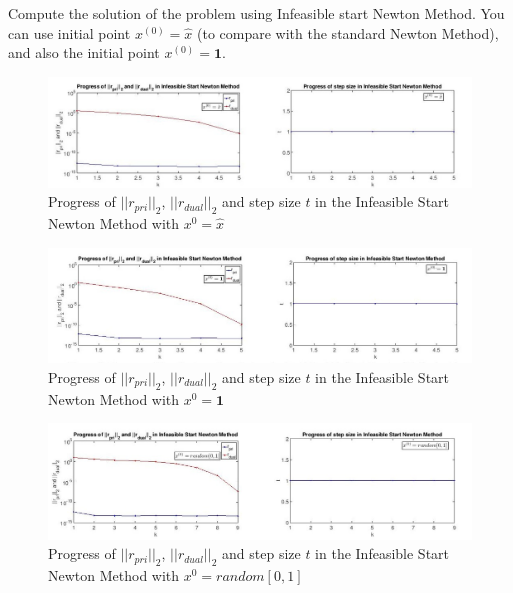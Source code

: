   Compute the solution of the problem using Infeasible start Newton Method.
  You can use initial point $x^{(0)} = \widehat{x}$ (to compare with the standard
  Newton Method), and also the initial point $x^{(0)} = \mathbf{1}$.
    \begin{figure}[H]
  \centering
\includegraphics[width=\textwidth]{source/prob3/fig1}
\caption{Progress of $\vert \vert r_{pri} \vert \vert_{2}$, $\vert \vert r_{dual} \vert \vert_{2}$ and step size $t$ in the Infeasible Start Newton Method with $x^{0} = \widehat{x}$}
\end{figure}
  \begin{figure}[H]
  \centering
\includegraphics[width=\textwidth]{source/prob3/fig2}
\caption{Progress of $\vert \vert r_{pri} \vert \vert_{2}$, $\vert \vert r_{dual} \vert \vert_{2}$ and step size $t$ in the Infeasible Start Newton Method with $x^{0} = \mathbf{1}$}
\end{figure}
  \begin{figure}[H]
  \centering
\includegraphics[width=\textwidth]{source/prob3/fig3}
\caption{Progress of $\vert \vert r_{pri} \vert \vert_{2}$, $\vert \vert r_{dual} \vert \vert_{2}$ and step size $t$ in the Infeasible Start Newton Method with $x^{0} = random[0,1]$}
\end{figure}